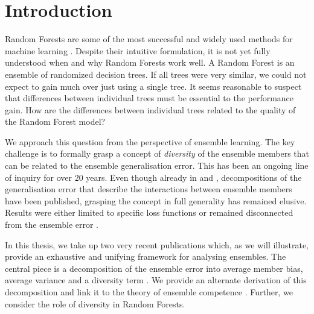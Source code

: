 \documentclass[
	twoside=false, %
]{kaobook}
\begin{document}

\chapter{Introduction}

Random Forests are some of the most successful and widely used methods for machine learning \cite{biau_RandomForestGuided_2016,yang_ReviewEnsembleMethods_2010}. Despite their intuitive formulation, it is not yet fully understood when and why Random Forests work well. 
A Random Forest is an ensemble of randomized decision trees.
If all trees were very similar, we could not expect to gain much over just using a single tree.  
It seems reasonable to suspect that differences between individual trees must be essential to the performance gain. How are the differences between individual trees related to the quality of the Random Forest model?

We approach this question from the perspective of ensemble learning. The key challenge is to formally grasp a concept of \textit{diversity} of the ensemble members that can be related to the ensemble generalisation error.
This has been an ongoing line of inquiry for over 20 years. 
Even though already in \citeyear{krogh_NeuralNetworkEnsembles_1995} and \citeyear{ueda_GeneralizationErrorEnsemble_1996}, decompositions of the generalisation error that describe the interactions between ensemble members have been published, grasping the concept in full generality has remained elusive. Results were either limited to specific loss functions or remained disconnected from the ensemble error \cite{kuncheva_MeasuresDiversityClassifier_2003}.

In this thesis, we take up two very recent publications 
\cite{wood_UnifiedTheoryDiversity_2023, theisen_WhenAreEnsembles_2023}
which, as we will illustrate, provide an exhaustive and unifying framework for analysing ensembles. The central piece is a decomposition of the ensemble error into average member bias, average variance and a diversity term \cite{wood_UnifiedTheoryDiversity_2023}.
We provide an alternate derivation of this decomposition and link it to the theory of ensemble competence \cite{theisen_WhenAreEnsembles_2023}. Further, we consider the role of diversity in Random Forests.
\end{document}
